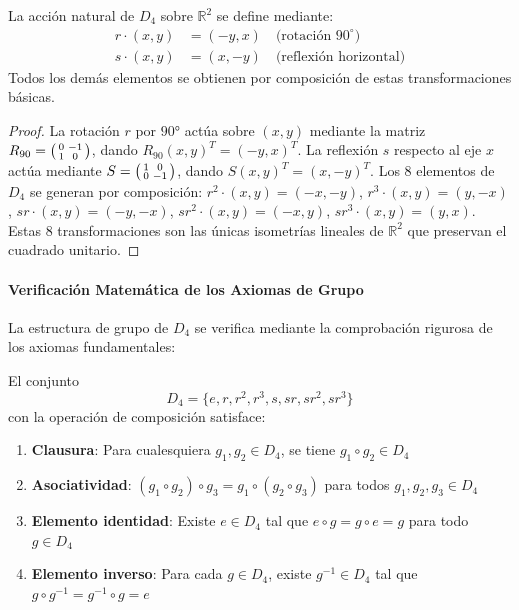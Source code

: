 \begin{proposition}
La acción natural de $D_4$ sobre $\mathbb{R}^2$ se define mediante:
\begin{align}
r \cdot (x,y) &= (-y, x) \quad \text{(rotación $90^\circ$)} \\
s \cdot (x,y) &= (x, -y) \quad \text{(reflexión horizontal)}
\end{align}
Todos los demás elementos se obtienen por composición de estas transformaciones básicas.
\end{proposition}

\begin{proof}
La rotación $r$ por $90°$ actúa sobre $(x,y)$ mediante la matriz $R_{90} = \begin{psmallmatrix} 0 & -1 \\ 1 & 0 \end{psmallmatrix}$, dando $R_{90}(x,y)^T = (-y,x)^T$. La reflexión $s$ respecto al eje $x$ actúa mediante $S = \begin{psmallmatrix} 1 & 0 \\ 0 & -1 \end{psmallmatrix}$, dando $S(x,y)^T = (x,-y)^T$. Los 8 elementos de $D_4$ se generan por composición: $r^2 \cdot (x,y) = (-x,-y)$, $r^3 \cdot (x,y) = (y,-x)$, $sr \cdot (x,y) = (-y,-x)$, $sr^2 \cdot (x,y) = (-x,y)$, $sr^3 \cdot (x,y) = (y,x)$. Estas 8 transformaciones son las únicas isometrías lineales de $\mathbb{R}^2$ que preservan el cuadrado unitario.
\end{proof}

\paragraph{Verificación Matemática de los Axiomas de Grupo}

La estructura de grupo de $D_4$ se verifica mediante la comprobación rigurosa de los axiomas fundamentales:

\begin{theorem}[Axiomas de $D_4$]
El conjunto 
\[
D_4 = \{e, r, r^2, r^3, s, sr, sr^2, sr^3\}
\]
 con la operación de composición satisface:

\begin{enumerate}
    \item \textbf{Clausura}: Para cualesquiera $g_1, g_2 \in D_4$, se tiene $g_1 \circ g_2 \in D_4$
    \item \textbf{Asociatividad}: $(g_1 \circ g_2) \circ g_3 = g_1 \circ (g_2 \circ g_3)$ para todos $g_1, g_2, g_3 \in D_4$
    \item \textbf{Elemento identidad}: Existe $e \in D_4$ tal que $e \circ g = g \circ e = g$ para todo $g \in D_4$
    \item \textbf{Elemento inverso}: Para cada $g \in D_4$, existe $g^{-1} \in D_4$ tal que $g \circ g^{-1} = g^{-1} \circ g = e$
\end{enumerate}
\end{theorem}

